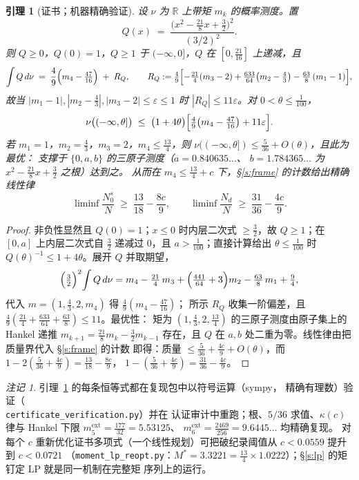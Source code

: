 \documentclass[11pt]{article}
\numberwithin{equation}{section}
\newtheorem{lemma}[theorem]{引理}
\theoremstyle{definition}
\theoremstyle{remark}
\newtheorem{remark}[theorem]{注记}
\begin{document}
\begin{lemma}[证书；机器精确验证]\label{l:cert}
设 $\nu$ 为 $\mathbb R$ 上带矩 $m_k$ 的概率测度。置
\[
Q(x)\;=\;\frac{\bigl(x^2-\tfrac{21}{8}x+\tfrac32\bigr)^2}{(3/2)^2}.
\]
则 $Q\ge0$，$Q(0)=1$，$Q\ge1$ 于 $(-\infty,0]$，$Q$ 在
$[0,\tfrac{21}{16}]$ 上递减，且
\begin{equation}\label{e:EQ}
\int Q\,d\nu \;=\; \frac{4}{9}\Bigl(m_4-\tfrac{47}{16}\Bigr)
\;+\;R_Q,\qquad
R_Q:=\tfrac{4}{9}\Bigl[-\tfrac{21}{4}(m_3-2)
+\tfrac{633}{64}\bigl(m_2-\tfrac43\bigr)
-\tfrac{63}{8}\,(m_1-1)\Bigr],
\end{equation}
故当 $|m_1-1|,|m_2-\tfrac43|,|m_3-2|\le\varepsilon\le1$ 时
$|R_Q|\le11\varepsilon$。对 $0<\theta\le\tfrac1{100}$，
\[
\nu\bigl((-\infty,\theta]\bigr)
\;\le\;\bigl(1+4\theta\bigr)
\Bigl[\tfrac{4}{9}\bigl(m_4-\tfrac{47}{16}\bigr)
+11\varepsilon\Bigr].
\]
若 $m_1=1$，$m_2=\tfrac43$，$m_3=2$，$m_4\le\tfrac{13}4$，则
$\nu((-\infty,\theta])\le\tfrac5{36}+O(\theta)$，且此为最优：
支撑于 $\{0,a,b\}$ 的三原子测度（$a=0.840635\ldots$、
$b=1.784365\ldots$ 为 $x^2-\tfrac{21}8x+\tfrac32$ 之根）达到之。
从而在 $m_4\le\tfrac{13}4+c$ 下，\S\ref{s:frame} 的计数给出精确
线性律
\[
\liminf\frac{N_0^{s}}{N}\;\ge\;\frac{13}{18}-\frac{8c}{9},
\qquad
\liminf\frac{N_d}{N}\;\ge\;\frac{31}{36}-\frac{4c}{9}.
\]
\end{lemma}

\begin{proof}
非负性显然且 $Q(0)=1$；$x\le0$ 时内层二次式 $\ge\tfrac32$，故
$Q\ge1$；在 $[0,a]$ 上内层二次式自 $\tfrac32$ 递减过 $0$，且
$a>\tfrac1{100}$；直接计算给出 $\theta\le\tfrac1{100}$ 时
$Q(\theta)^{-1}\le1+4\theta$。展开 $Q$ 并取期望，
\[
\Bigl(\tfrac32\Bigr)^2\!\int Q\,d\nu
=m_4-\tfrac{21}4\,m_3+\Bigl(\tfrac{441}{64}+3\Bigr)m_2
-\tfrac{63}8\,m_1+\tfrac94,
\]
代入 $m=(1,\tfrac43,2,m_4)$ 得 $\tfrac49(m_4-\tfrac{47}{16})$；
所示 $R_Q$ 收集一阶偏差，且
$\tfrac49(\tfrac{21}4+\tfrac{633}{64}+\tfrac{63}8)\le11$。最优性：
矩为 $(1,\tfrac43,2,\tfrac{13}4)$ 的三原子测度由原子集上的
Hankel 递推 $m_{k+1}=\tfrac{21}8m_k-\tfrac32m_{k-1}$ 存在，且 $Q$
在 $a,b$ 处二重为零。线性律由把质量界代入 \S\ref{s:frame} 的计数
即得：质量 $\le\tfrac5{36}+\tfrac{4c}9+O(\theta)$，而
$1-2(\tfrac5{36}+\tfrac{4c}9)=\tfrac{13}{18}-\tfrac{8c}9$，
$1-(\tfrac5{36}+\tfrac{4c}9)=\tfrac{31}{36}-\tfrac{4c}9$。
\end{proof}

\begin{remark}\label{r:certlp}
引理~\ref{l:cert} 的每条恒等式都在复现包中以符号运算（sympy，
精确有理数）验证（ \\ \texttt{certificate\_verification.py}）并在
认证审计中重跑；根、$5/36$ 求值、$\kappa(c)$ 律与 Hankel 下限
$m_5^{\mathrm{ext}}=\tfrac{177}{32}=5.53125$、
$m_6^{\mathrm{ext}}=\tfrac{2469}{256}=9.6445\ldots$ 均精确复现。
对每个 $c$ 重新优化证书多项式（一个线性规划）可把破纪录阈值从
$c<0.0559$ 提升到 $c<0.0721$
（\texttt{moment\_lp\_reopt.py}：$M^{*}=3.3221=\tfrac{13}4
\times1.0222$）；\S\ref{s:lp} 的矩钉定 LP 就是同一机制在完整矩
序列上的运行。
\end{remark}
\end{document}
